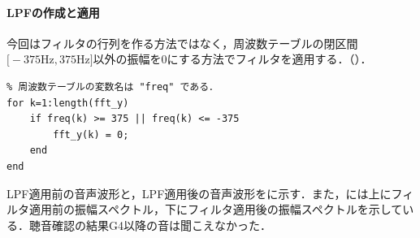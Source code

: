 \paragraph{LPFの作成と適用}
今回はフィルタの行列を作る方法ではなく，周波数テーブルの閉区間\(\big[-375\textrm{Hz},375\textrm{Hz}\big]\)以外の振幅を\(0\)にする方法でフィルタを適用する．（）\scall{}．
\begin{lstlisting}[caption={フィルターを適用する},label={src:フィルターを適用する},numbers={none}]
% データ列yをフーリエ変換後，Shiftしてabsをとったものを "fft_y" に格納している．
% 周波数テーブルの変数名は "freq" である．
for k=1:length(fft_y)
    if freq(k) >= 375 || freq(k) <= -375
        fft_y(k) = 0;
    end
end
\end{lstlisting}
\result
LPF適用前の音声波形と，LPF適用後の音声波形をに示す．また，には上にフィルタ適用前の振幅スペクトル，下にフィルタ適用後の振幅スペクトルを示している．聴音確認の結果G4以降の音は聞こえなかった．
